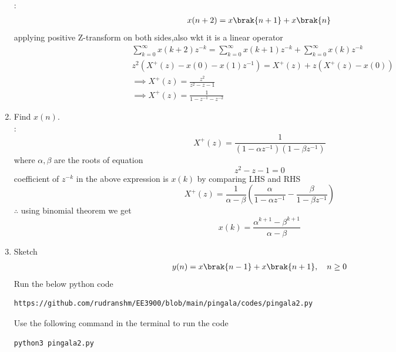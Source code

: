 \documentclass[journal,12pt,twocolumn]{IEEEtran}
\renewcommand\thesection{\arabic{section}}
\begin{document}
\begin{enumerate}[label=\thesection.\arabic*,ref=\thesection.\theenumi]
\solution:
\begin{align}
	x(n+2) = x\brak{n+1} + x\brak{n}
	\end{align}
	applying positive Z-transform on both sides,also wkt it is a linear operator
	\begin{align}
	&\sum_{k=0}^{\infty}x(k+2)z^{-k}=\sum_{k=0}^{\infty}x(k+1)z^{-k}+\sum_{k=0}^{\infty}x(k)z^{-k}\\
	&z^{2}(X^{+}(z)-x(0)-x(1)z^{-1})=X^{+}(z)+z(X^{+}(z)-x(0))\\
	&\implies X^{+}(z)=\frac{z^{2}}{z^{2}-z-1}\\
	&\implies X^{+}(z)=\frac{1}{1-z^{-1}-z^{-2}}
	\end{align}
	\item Find $x(n)$.\\
	\solution:
	\begin{equation}
	X^{+}(z)=\frac{1}{(1-\alpha z^{-1})(1-\beta z^{-1})}
	\end{equation}
	where $\alpha,\beta$ are the roots of equation
	\begin{equation}
	z^2-z-1=0
	\end{equation}
	coefficient of $z^{-k}$ in the above expression is $x(k)$ by comparing LHS and RHS\\
	\begin{equation}
	X^{+}(z)=\frac{1}{\alpha-\beta}\left(\frac{\alpha}{1-\alpha z^{-1}}-\frac{\beta}{1-\beta z^{-1}}\right)
	\end{equation}
	$\therefore$ using binomial theorem we get
	\begin{equation} 
	x(k)=\frac{\alpha^{k+1}-\beta^{k+1}}{\alpha - \beta}
	\end{equation}
	\item Sketch 
\begin{align}
	y(n)	 = x\brak{n-1} + x\brak{n+1},  \quad n \ge 0
\end{align}
\solution
Run the below python code 
\begin{lstlisting}
https://github.com/rudranshm/EE3900/blob/main/pingala/codes/pingala2.py
\end{lstlisting}
Use the following command in the terminal to run the code
\begin{lstlisting}
python3 pingala2.py
\end{lstlisting}
\begin{figure}
\centering

\end{figure}
\end{enumerate}
\end{document}
